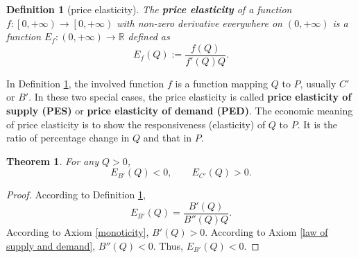 \documentclass{article}
\newtheorem{theorem}{Theorem}
\newtheorem{definition}{Definition}
\begin{document}
\begin{definition}[price elasticity]
\label{price elasticity}
The \textbf{price elasticity} of a function $f:\left[0,+\infty\right)\to\left[0,+\infty\right)$ with non-zero derivative everywhere on $\left(0,+\infty\right)$
is a function $E_f:\left(0,+\infty\right)\to\mathbb R$ defined as
$$E_f\left(Q\right):=\frac{f\left(Q\right)}{f'\left(Q\right)Q}.$$
\end{definition}

In Definition \ref{price elasticity}, the involved function $f$ is a function mapping $Q$ to $P$, usually $C'$ or $B'$.
In these two special cases, the price elasticity is called \textbf{price elasticity of supply (PES)} or \textbf{price elasticity of demand (PED)}.
The economic meaning of price elasticity is to show the responsiveness (elasticity) of $Q$ to $P$.
It is the ratio of percentage change in $Q$ and that in $P$.

\begin{theorem}
\label{sign of price elasticity}
For any $Q>0$,
$$E_{B'}\left(Q\right)<0,
\qquad E_{C'}\left(Q\right)>0.$$
\end{theorem}
\begin{proof}
According to Definition \ref{price elasticity},
$$E_{B'}\left(Q\right)=\frac{B'\left(Q\right)}{B''\left(Q\right)Q}.$$
According to Axiom \ref{monoticity}, $B'\left(Q\right)>0$.
According to Axiom \ref{law of supply and demand}, $B''\left(Q\right)<0$.
Thus, $E_{B'}\left(Q\right)<0$.
\end{proof}
\end{document}
